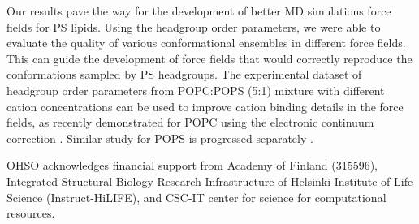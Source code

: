 \documentclass[aps,prl,superscriptaddress,twocolumn]{revtex4}
\begin{document}
Our results pave the way for the development of better MD simulations force fields
for PS lipids. Using the headgroup order parameters, we were able to evaluate the
quality of various conformational ensembles in different force fields.
This can guide the development of force fields that would correctly reproduce the
conformations sampled by PS headgroups. The experimental dataset of headgroup order
parameters from POPC:POPS (5:1) mixture with different cation concentrations can
be used to improve cation binding details in the force fields, as recently demonstrated
for POPC using the electronic continuum correction \cite{melcr18}.
Similar study for POPS is progressed separately \cite{ECCpops}.

%

\begin{acknowledgments}
  OHSO acknowledges financial support from Academy of Finland (315596),
  Integrated Structural Biology Research Infrastructure of
  Helsinki Institute of Life Science (Instruct-HiLIFE), and
  CSC-IT center for science for computational resources.
\end{acknowledgments}

\newpage





\listoftodos
\end{document}
